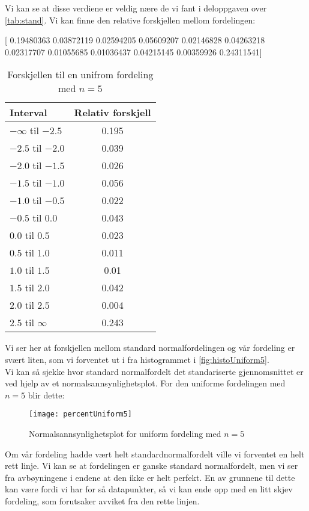 \documentclass[a4paper,norsk, 10pt]{article}
\begin{document}
Vi kan se at disse verdiene er veldig nære de vi fant i deloppgaven over \ref{tab:stand}. Vi kan finne den relative forskjellen mellom fordelingen:

[ 0.19480363  0.03872119  0.02594205  0.05609207  0.02146828  0.04263218
  0.02317707  0.01055685  0.01036437  0.04215145  0.00359926  0.24311541]


\begin{table}[H]
\centering
\begin{tabular}{|l|c|}
\hline
Interval & Relativ forskjell \\
\hline
$- \infty$ til $-2.5$ & 0.195\\
$- 2.5$ til $-2.0$ & 0.039\\
$- 2.0$ til $-1.5$ & 0.026\\
$- 1.5$ til $-1.0$ & 0.056\\
$- 1.0$ til $-0.5$ & 0.022\\
$- 0.5$ til $0.0$ & 0.043\\

$ 0.0$ til $0.5$ & 0.023\\
$ 0.5$ til $1.0$ & 0.011\\
$ 1.0$ til $1.5$ & 0.01\\
$ 1.5$ til $2.0$ & 0.042\\
$ 2.0$ til $2.5$ & 0.004\\
$ 2.5$ til $\infty$ & 0.243\\ \hline
\end{tabular}
\caption{Forskjellen til en unifrom fordeling med $n = 5$}
\label{tab:forskjellUniform5}
\end{table}

Vi ser her at forskjellen mellom standard normalfordelingen og vår fordeling er svært liten, som vi forventet ut i fra histogrammet i \ref{fig:histoUniform5}.\\

Vi kan så sjekke hvor standard normalfordelt det standariserte gjennomsnittet er ved hjelp av et normalsannsynlighetsplot. For den uniforme fordelingen med $n = 5$ blir dette:

\begin{figure}[H]
\centering
\texttt{[image: percentUniform5]}
\caption{Normalsannsynlighetsplot for uniform fordeling med $n = 5$}
\end{figure}

Om vår fordeling hadde vært helt standardnormalfordelt ville vi forventet en helt rett linje. Vi kan se at fordelingen er ganske standard normalfordelt, men vi ser fra avbøyningene i endene at den ikke er helt perfekt. En av grunnene til dette kan være fordi vi har for så datapunkter, så vi kan ende opp med en litt skjev fordeling, som forutsaker avviket fra den rette linjen.
\end{document}
